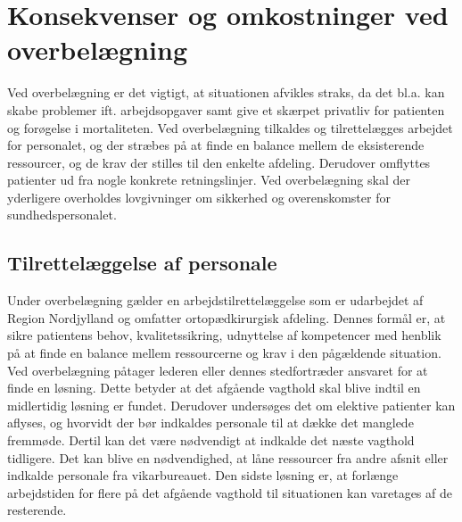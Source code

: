






\section{Konsekvenser og omkostninger ved overbelægning}
Ved overbelægning er det vigtigt, at situationen afvikles straks, da det bl.a. kan skabe problemer ift. arbejdsopgaver samt give et skærpet privatliv for patienten og forøgelse i mortaliteten. \cite{Madsen2014}
Ved overbelægning tilkaldes og tilrettelægges arbejdet for personalet, og der stræbes på at finde en balance mellem de eksisterende ressourcer, og de krav der stilles til den enkelte afdeling. \cite{Bjerg2016} Derudover omflyttes patienter ud fra nogle konkrete retningslinjer. \cite{Beredskab2016} Ved overbelægning skal der yderligere overholdes lovgivninger om sikkerhed og overenskomster for sundhedspersonalet. \cite{Beredskab2016}


\subsection{Tilrettelæggelse af personale} \label{Tilret}
Under overbelægning gælder en arbejdstilrettelæggelse som er udarbejdet af Region Nordjylland og omfatter ortopædkirurgisk afdeling. Dennes formål er, at sikre patientens behov, kvalitetssikring, udnyttelse af kompetencer med henblik på at finde en balance mellem ressourcerne og krav i den pågældende situation. Ved overbelægning påtager lederen eller dennes stedfortræder ansvaret for at finde en løsning. Dette betyder at det afgående vagthold skal blive indtil en midlertidig løsning er fundet. Derudover undersøges det om elektive patienter kan aflyses, og hvorvidt der bør indkaldes personale til at dække det manglede fremmøde. Dertil kan det være nødvendigt at indkalde det næste vagthold tidligere. Det kan blive en nødvendighed, at låne ressourcer fra andre afsnit eller indkalde personale fra vikarbureauet. Den sidste løsning er, at forlænge arbejdstiden for flere på det afgående vagthold til situationen kan varetages af de resterende. \cite{Bjerg2016}

